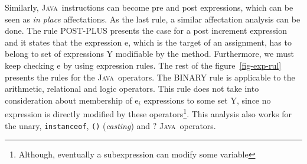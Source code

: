 \documentclass[a4paper]{llncs}
\newcommand{\java}{\textsc{Java}}
\begin{document}
Similarly, \java~instructions can become pre and post expressions,
which can be seen as \emph{in place} affectations. As the last rule,
a similar affectation analysis can be done. The rule \textup{POST-PLUS}
presents the case for a post increment expression and it states that
the expression \textup{e}, which is the target of an assignment, has
to belong to
set of expressions \textup{Y} modifiable by the method. Furthermore,
we must keep checking \textup{e} by using expression rules. The rest
of the figure~\ref{fig-exp-rul} presents the
rules for the \java~operators. The \textup{BINARY} rule is applicable
to the arithmetic, relational and logic operators. This rule
does not take into consideration about membership of \textup{e}$_i$
expressions to some set \textsc{Y}, 
since no expression is directly modified by these
operators\footnote{Although, eventually a subexpression can modify
some variable}. This analysis also works for the unary,
\texttt{instanceof}, \texttt{()} (\emph{casting}) and $?$
\java~operators.
\end{document}
